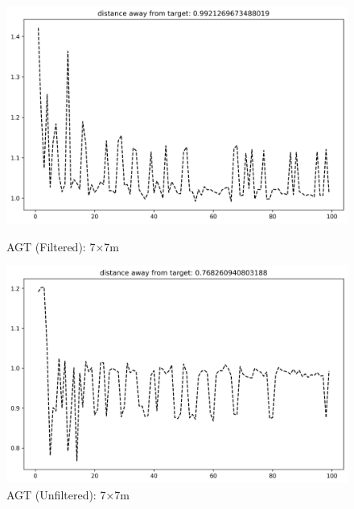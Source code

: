 \documentclass[runningheads]{llncs}
\begin{document}
\begin{figure}[H]
	\centering
	\begin{minipage}{0.49\textwidth}
		\centering
		\includegraphics[width=\textwidth]{figures/filtered/xgbrf_custom_7.png}
		\caption*{AGT (Filtered): 7×7m}
	\end{minipage}
	\hfill
	\begin{minipage}{0.49\textwidth}
		\centering
		\includegraphics[width=\textwidth]{figures/unfiltered/xgbrf_custom_7.png}
		\caption*{AGT (Unfiltered): 7×7m}
	\end{minipage}
\end{figure}
\end{document}
